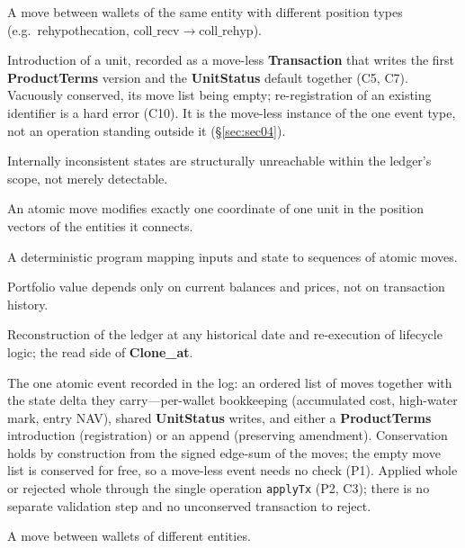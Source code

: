 \begin{description}[style=nextline]
\item[Reclassification] A move between wallets of the same entity with different position types (e.g.\ rehypothecation, $\mathrm{coll\_recv}\to\mathrm{coll\_rehyp}$).

\item[Registration] Introduction of a unit, recorded as a move-less \textbf{Transaction} that writes the first \textbf{ProductTerms} version and the \textbf{UnitStatus} default together (C5, C7). Vacuously conserved, its move list being empty; re-registration of an existing identifier is a hard error (C10). It is the move-less instance of the one event type, not an operation standing outside it (\S\ref{sec:sec04}).

\item[Self-consistency] Internally inconsistent states are structurally unreachable within the ledger's scope, not merely detectable.

\item[Single-Coordinate Move Principle] An atomic move modifies exactly one coordinate of one unit in the position vectors of the entities it connects.

\item[Smart contract] A deterministic program mapping inputs and state to sequences of atomic moves.

\item[State-sufficiency] Portfolio value depends only on current balances and prices, not on transaction history.

\item[Time travel] Reconstruction of the ledger at any historical date and re-execution of lifecycle logic; the read side of \textbf{Clone\_at}.

\item[Transaction] The one atomic event recorded in the log: an ordered list of moves together with the state delta they carry---per-wallet bookkeeping (accumulated cost, high-water mark, entry NAV), shared \textbf{UnitStatus} writes, and either a \textbf{ProductTerms} introduction (registration) or an append (preserving amendment). Conservation holds by construction from the signed edge-sum of the moves; the empty move list is conserved for free, so a move-less event needs no check (P1). Applied whole or rejected whole through the single operation \texttt{applyTx} (P2, C3); there is no separate validation step and no unconserved transaction to reject.

\item[Transfer] A move between wallets of different entities.


\end{description}
